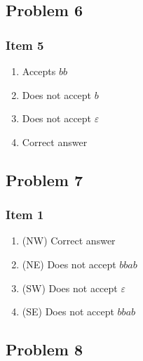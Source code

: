 \subsection{Problem 6}
\setcounter{subsubsection}{4}
\subsubsection{Item 5}
\begin{enumerate}[label=(\alph*)]
	\item Accepts $bb$
	\item Does not accept $b$
	\item Does not accept $\varepsilon$
	\item \label{itm:6_5_correct} Correct answer
\end{enumerate}
\subsection{Problem 7}
\subsubsection{Item 1}
\begin{enumerate}[label=(\alph*)]
	\item \label{itm:7_1_correct} (NW) Correct answer
	\item (NE) Does not accept $bbab$
	\item (SW) Does not accept $\varepsilon$
	\item (SE) Does not accept $bbab$
\end{enumerate}
\subsection{Problem 8}
